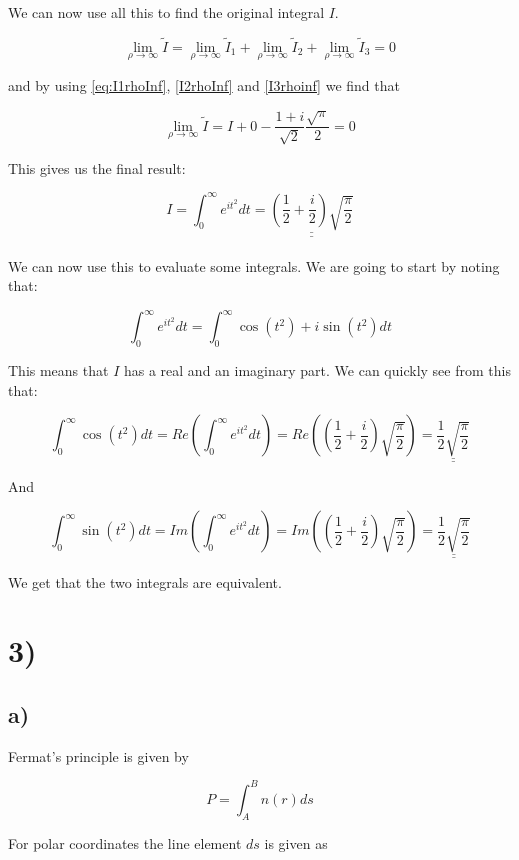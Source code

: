 \documentclass[a4paper,norsk, 10pt]{article}
\begin{document}
We can now use all this to find the original integral $I$.

$$
\lim_{\rho \rightarrow \infty} \tilde{I} = \lim_{\rho \rightarrow \infty} \tilde{I}_1 + \lim_{\rho \rightarrow \infty} \tilde{I}_2 + \lim_{\rho \rightarrow \infty} \tilde{I}_3 = 0
$$

and by using \ref{eq:I1rhoInf}, \ref{I2rhoInf} and \ref{I3rhoinf} we find that

$$
\lim_{\rho \rightarrow \infty} \tilde{I} = I + 0 - \frac{1+i}{\sqrt{2}} \frac{\sqrt{\pi}}{2} = 0
$$

This gives us the final result:

$$
I = \int_0^{\infty}e^{it^2}dt =\underline{\underline{\left(\frac{1}{2} +\frac{i}{2}\right) \sqrt{\frac{\pi}{2}}}}
$$\\

We can now use this to evaluate some integrals. We are going to start by noting that:

$$
\int_0^{\infty}e^{it^2}dt = \int_0^{\infty} \cos(t^2) + i\sin(t^2)dt
$$

This means that $I$ has a real and an imaginary part. We can quickly see from this that:

$$
\int_0^{\infty} \cos(t^2)dt = Re(\int_0^{\infty}e^{it^2}dt) = Re\left(\left(\frac{1}{2} +\frac{i}{2}\right) \sqrt{\frac{\pi}{2}}\right) = \underline{\underline{\frac{1}{2}\sqrt{\frac{\pi}{2}}}}
$$

And

$$
\int_0^{\infty} \sin(t^2)dt = Im(\int_0^{\infty}e^{it^2}dt) = Im\left(\left(\frac{1}{2} +\frac{i}{2}\right) \sqrt{\frac{\pi}{2}}\right) = \underline{\underline{\frac{1}{2}\sqrt{\frac{\pi}{2}}}}
$$

We get that the two integrals are equivalent. 


\newpage
\section*{3)}
\subsection*{a)}

Fermat's principle is given by

\begin{equation}
P = \int_A^B n(r) ds
\end{equation}

For polar coordinates the line element $ds$ is given as 
\end{document}
